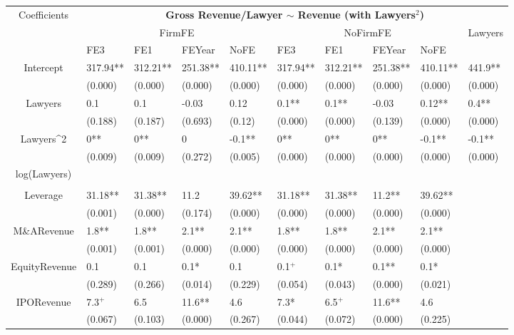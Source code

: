 \documentclass{article}
\begin{document}
\begin{table}[H]
\centering
\begin{tabular}{|clllllllll|}
\hline
\multirow{3}{*}{Coefficients} & \multicolumn{9}{c|}{\textbf{Gross Revenue/Lawyer $\sim$ Revenue (with Lawyers$^2$)}} \\
\cline{2-10}
& \multicolumn{4}{c}{FirmFE} & \multicolumn{4}{c}{NoFirmFE} & \multirow{2}{*}{Lawyers} \\
\cline{2-9}
& FE3 & FE1 & FEYear & NoFE & FE3 & FE1 & FEYear & NoFE &  \\
\hline
 
Intercept & 317.94** & 312.21** & 251.38** & 410.11** & 317.94** & 312.21** & 251.38** & 410.11** & 441.9** \\ 
   & (0.000) & (0.000) & (0.000) & (0.000) & (0.000) & (0.000) & (0.000) & (0.000) & (0.000) \\ 
  Lawyers & 0.1 & 0.1 & -0.03 & 0.12 & 0.1** & 0.1** & -0.03 & 0.12** & 0.4** \\ 
   & (0.188) & (0.187) & (0.693) & (0.12) & (0.000) & (0.000) & (0.139) & (0.000) & (0.000) \\ 
  Lawyers^2 & 0** & 0** & 0 & -0.1** & 0** & 0** & 0** & -0.1** & -0.1** \\ 
   & (0.009) & (0.009) & (0.272) & (0.005) & (0.000) & (0.000) & (0.000) & (0.000) & (0.000) \\ 
  log(Lawyers) &  &  &  &  &  &  &  &  &  \\ 
   &  &  &  &  &  &  &  &  &  \\ 
  Leverage & 31.18** & 31.38** & 11.2 & 39.62** & 31.18** & 31.38** & 11.2** & 39.62** &  \\ 
   & (0.001) & (0.000) & (0.174) & (0.000) & (0.000) & (0.000) & (0.000) & (0.000) &  \\ 
  M\&ARevenue & 1.8** & 1.8** & 2.1** & 2.1** & 1.8** & 1.8** & 2.1** & 2.1** &  \\ 
   & (0.001) & (0.001) & (0.000) & (0.000) & (0.000) & (0.000) & (0.000) & (0.000) &  \\ 
  EquityRevenue & 0.1 & 0.1 & 0.1* & 0.1 & 0.1$^{+}$ & 0.1* & 0.1** & 0.1* &  \\ 
   & (0.289) & (0.266) & (0.014) & (0.229) & (0.054) & (0.043) & (0.000) & (0.021) &  \\ 
  IPORevenue & 7.3$^{+}$ & 6.5 & 11.6** & 4.6 & 7.3* & 6.5$^{+}$ & 11.6** & 4.6 &  \\ 
   & (0.067) & (0.103) & (0.000) & (0.267) & (0.044) & (0.072) & (0.000) & (0.225) &  \\ 

\end{tabular}
\end{table}
\end{document}

